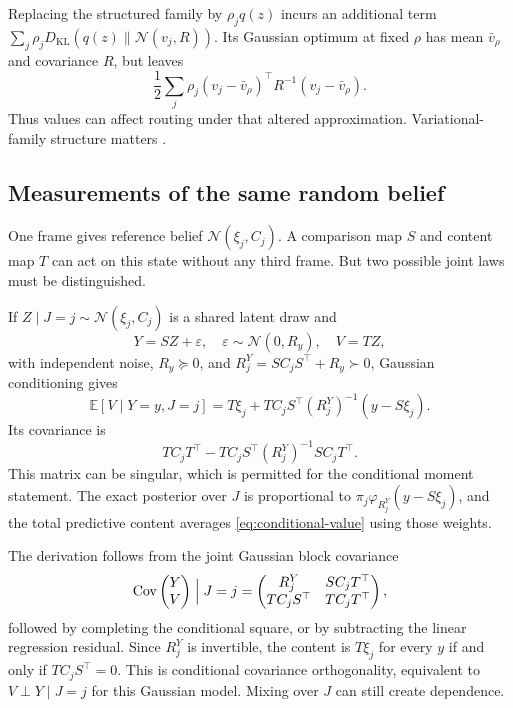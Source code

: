 \documentclass[11pt,letterpaper]{article}
\newcommand{\KL}{D_{\mathrm{KL}}}
\newcommand{\E}{\mathbb E}
\newcommand{\Cov}{\operatorname{Cov}}
\theoremstyle{remark}
\begin{document}
Replacing the structured family by $\rho_jq(z)$ incurs an additional term
$\sum_j\rho_j\KL(q(z)\|\mathcal N(v_j,R))$. Its Gaussian optimum at fixed $\rho$ has mean $\bar v_\rho$ and covariance $R$, but leaves
\begin{equation}
 \frac12\sum_j\rho_j(v_j-\bar v_\rho)^\top R^{-1}(v_j-\bar v_\rho).
\end{equation}
Thus values can affect routing under that altered approximation. Variational-family structure matters \cite{Blei2017}.

\subsection{Measurements of the same random belief}
One frame gives reference belief $\mathcal N(\xi_j,C_j)$. A comparison map $S$ and content map $T$ can act on this state without any third frame. But two possible joint laws must be distinguished.

If $Z\mid J=j\sim\mathcal N(\xi_j,C_j)$ is a shared latent draw and
\begin{equation}
 Y=SZ+\varepsilon,\quad \varepsilon\sim\mathcal N(0,R_y),\quad
 V=TZ,
\end{equation}
with independent noise, $R_y\succeq0$, and $R_j^Y=SC_jS^\top+R_y\succ0$, Gaussian conditioning gives
\begin{equation}
 \boxed{\E[V\mid Y=y,J=j]=
 T\xi_j+TC_jS^\top(R_j^Y)^{-1}(y-S\xi_j).}
 \label{eq:conditional-value}
\end{equation}
Its covariance is
\begin{equation}
 TC_jT^\top-TC_jS^\top(R_j^Y)^{-1}SC_jT^\top.
 \label{eq:conditional-cov}
\end{equation}
This matrix can be singular, which is permitted for the conditional moment statement. The exact posterior over $J$ is proportional to
$\pi_j\varphi_{R_j^Y}(y-S\xi_j)$, and the total predictive content averages \eqref{eq:conditional-value} using those weights.

The derivation follows from the joint Gaussian block covariance
\begin{equation}
 \Cov\begin{pmatrix}Y\\V\end{pmatrix}\Bigm|J=j
 =\begin{pmatrix}
 R_j^Y&SC_jT^\top\\
 TC_jS^\top&TC_jT^\top
 \end{pmatrix},
\end{equation}
followed by completing the conditional square, or by subtracting the linear regression residual. Since $R_j^Y$ is invertible, the content is $T\xi_j$ for every $y$ if and only if $TC_jS^\top=0$. This is conditional covariance orthogonality, equivalent to $V\perp Y\mid J=j$ for this Gaussian model. Mixing over $J$ can still create dependence.
\end{document}
